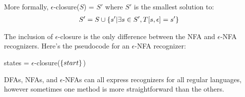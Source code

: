 \documentclass[]{article}
\DeclarePairedDelimiter{\set}{\lbrace}{\rbrace}
\theoremstyle{definition}
\begin{document}
			More formally, $\epsilon$-closure($S$) = $S'$ where $S'$ is the smallest solution to:
			\begin{align*}
				S' = S \cup \set{s' | \exists s \in S', T[s, \epsilon] = s'}
			\end{align*}

			The inclusion of $\epsilon$-closure is the only difference between the NFA and $\epsilon$-NFA recognizers. Here's the pseudocode for an $\epsilon$-NFA recognizer: \\
			\begin{algorithm}[H]
				states = $\epsilon$-closure($\set{start}$)\;
			\end{algorithm}

			DFAs, NFAs, and $\epsilon$-NFAs can all express recognizers for all regular languages, however sometimes one method is more straightforward than the others.
\end{document}

